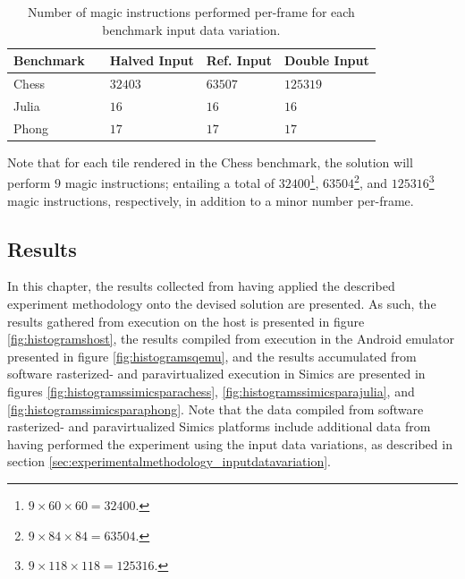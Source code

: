 \begin{table}
  \centering
  \begin{tabular}{lllll}
    Benchmark & \phantom{Input Data} & Halved Input & Ref. Input & Double Input \\ \hline
    Chess & \phantom{No. Tiles} & $32403$ & $63507$ & $125319$ \\
    Julia & \phantom{No. Iterations} & $16$ & $16$ & $16$ \\
    Phong & \phantom{Texture Resolution} & $17$ & $17$ & $17$ \\
  \end{tabular}
  \caption[Input data variation magic instruction count]{Number of magic instructions performed per-frame for each benchmark input data variation.}
  \label{tab:keyvalsmagicinstructions}
\end{table}

Note that for each tile rendered in the Chess benchmark, the solution will perform $9$ magic instructions; entailing a total of $32400$\footnote{$9\times60\times60=32400$.}, $63504$\footnote{$9\times84\times84=63504$.}, and $125316$\footnote{$9\times118\times118=125316$.} magic instructions, respectively, in addition to a minor number per-frame.

\subsection{Results}
\label{sec:results}
In this chapter, the results collected from having applied the described experiment methodology onto the devised solution are presented.
As such, the results gathered from execution on the host is presented in figure \ref{fig:histogramshost}, the results compiled from execution in the Android emulator presented in figure \ref{fig:histogramsqemu}, and the results accumulated from software rasterized- and paravirtualized execution in Simics are presented in figures \ref{fig:histogramssimicsparachess}, \ref{fig:histogramssimicsparajulia}, and \ref{fig:histogramssimicsparaphong}.
Note that the data compiled from software rasterized- and paravirtualized Simics platforms include additional data from having performed the experiment using the input data variations, as described in section \ref{sec:experimentalmethodology_inputdatavariation}.

